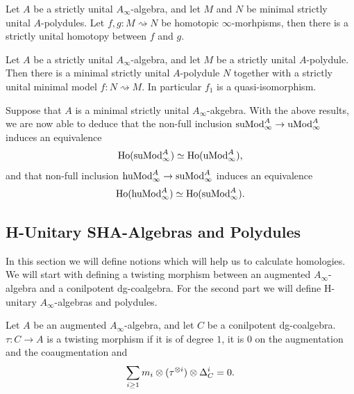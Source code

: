 \documentclass[../thesis.tex]{subfiles}
\begin{document}
            \begin{thm}
                Let $A$ be a strictly unital $A_\infty$-algebra, and let $M$ and $N$ be minimal strictly unital $A$-polydules. Let $f, g : M \rightsquigarrow N$ be homotopic $\infty$-morhpisms, then there is a strictly unital homotopy between $f$ and $g$.
            \end{thm}

            \begin{proposition}
                Let $A$ be a strictly unital $A_\infty$-algebra, and let $M$ be a strictly unital $A$-polydule. Then there is a minimal strictly unital $A$-polydule $N$ together with a strictly unital minimal model $f : N \rightsquigarrow M$. In particular $f_1$ is a quasi-isomorphism.
            \end{proposition}

            Suppose that $A$ is a minimal strictly unital $A_\infty$-akgebra. With the above results, we are now able to deduce that the non-full inclusion $\tt{suMod}_\infty^A \rightarrow \tt{uMod}_\infty^A$ induces an equivalence
            \begin{align*}
                \tt{Ho}(\tt{suMod}_\infty^A) \simeq \tt{Ho}(\tt{uMod}_\infty^A)\tt{,}
            \end{align*}
            and that non-full inclusion $\tt{huMod}_\infty^A \rightarrow \tt{suMod}_\infty^A$ induces an equivalence
            \begin{align*}
                \tt{Ho}(\tt{huMod}_\infty^A) \simeq \tt{Ho}(\tt{suMod}_\infty^A)\tt{.}
            \end{align*}

        \subsection{H-Unitary SHA-Algebras and Polydules}

            In this section we will define notions which will help us to calculate homologies. We will start with defining a twisting morphism between an augmented $A_\infty$-algebra and a conilpotent dg-coalgebra. For the second part we will define H-unitary $A_\infty$-algebras and polydules.

            \begin{definition}
                Let $A$ be an augmented $A_\infty$-algebra, and let $C$ be a conilpotent dg-coalgebra. $\tau : C \rightarrow A$ is a twisting morphism if it is of degree $1$, it is $0$ on the augmentation and the coaugmentation and
                \begin{align*}
                    \sum_{i \geq 1} m_i \otimes (\tau^{\otimes i}) \otimes \Delta_C^i = 0\tt{.}
                \end{align*}
            \end{definition}
\end{document}
